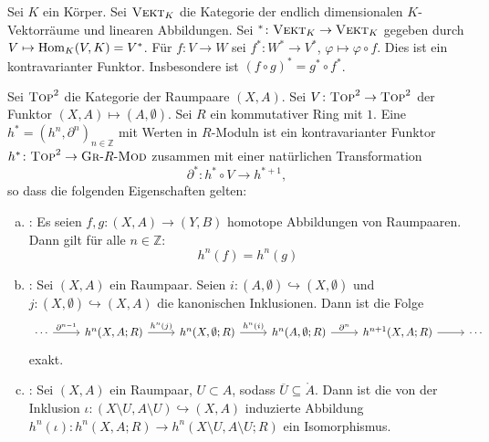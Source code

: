 \begin{beispiel}[name=Dualraumfunktor]
Sei $K$ ein Körper. Sei $\textsc{Vekt}_K$ die Kategorie der endlich dimensionalen $K$-Vektorräume und linearen Abbildungen. Sei 
${ }^* \colon \textsc{Vekt}_K \to \textsc{Vekt}_K$ gegeben durch $V \mapsto \operatorname{Hom}_K(V,K)=V^*$. Für $f \colon V \to W$ sei $f^* \colon W^* \to V^*$, 
$\varphi \mapsto \varphi \circ f$. Dies ist ein kontravarianter Funktor. Insbesondere ist $(f \circ g)^* = g^* \circ f^*$.	
\end{beispiel}


\begin{definition}[{name=[Verallgemeinerte Kohomologietheorie]}]
Sei $\textsc{Top}^2$ die Kategorie der Raumpaare $(X,A)$. Sei $V \colon \textsc{Top}^2 \to \textsc{Top}^2$ der Funktor $(X,A) \mapsto(A,\emptyset)$. Sei $R$ ein kommutativer Ring mit $1$. Eine 
 $h^* = (h^n, \partial^n)_{n \in \mathds{Z}}$ mit Werten in $R$-Moduln ist ein kontravarianter Funktor 
$h^* \colon \textsc{Top}^2 \to \textsc{Gr}\text{-}R\text{-}\textsc{Mod}$ zusammen mit einer natürlichen Transformation 
\[
	\partial^* \colon h^* \circ V \to h^{*+1},
\]
so dass die folgenden Eigenschaften gelten:
\begin{enumerate}[a)]
	\item {}: Es seien $f,g \colon (X,A) \to (Y,B)$ homotope Abbildungen von Raumpaaren. Dann gilt für alle $n \in \mathds{Z}$: 
	\[
		h^n(f)= h^n(g)
	\]
	\item {}: Sei $(X,A)$ ein Raumpaar. Seien $i \colon (A,\emptyset) \hookrightarrow (X,\emptyset)$ und 
	$j \colon (X,\emptyset) \hookrightarrow (X,A)$ die kanonischen Inklusionen. Dann ist die Folge 
	\[
		\begin{tikzcd}
			\cdots \rar["\partial^{n-1}"] & h^n(X,A;R) \rar["h^{n}(j)"] & h^n (X,\emptyset;R) \rar["h^n(i)"] & h^n(A, \emptyset;R) \rar["\partial^n"] & h^{n+1}(X,A;R) \rar & 
			\cdots
		\end{tikzcd}
	\]
	exakt.
	\item {}: Sei $(X,A)$ ein Raumpaar, $U \subset A$, sodass $\overline{U} \subseteq \mathring{A}$. Dann ist die von der Inklusion 
	$\iota \colon (X \setminus U, A \setminus U) \hookrightarrow (X,A)$ induzierte Abbildung $h^n(\iota) \colon h^n(X,A;R) \to h^n(X \setminus U, A \setminus U;R)$ ein 
	Isomorphismus.
\end{enumerate}	
\end{definition}

